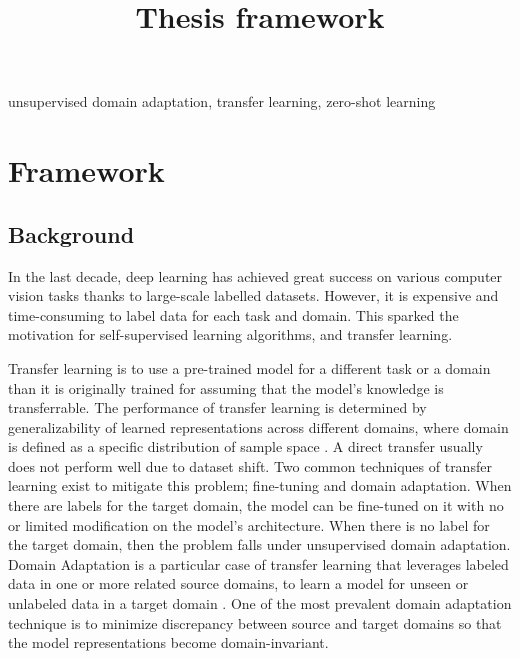 \documentclass[conference]{IEEEtran}
\begin{document}

\title{Thesis framework\\ }

\author{
}


\maketitle

\begin{abstract}
\end{abstract}

\begin{IEEEkeywords}
unsupervised domain adaptation, transfer learning, zero-shot learning
\end{IEEEkeywords}

\section{Framework}

\subsection{Background}

In the last decade, deep learning has achieved great success on various computer vision tasks thanks to large-scale labelled datasets. However, it is expensive and time-consuming to label data for each task and domain. This sparked the motivation for self-supervised learning algorithms, and transfer learning. 

Transfer learning is to use a pre-trained model for a different task or a domain than it is originally trained for assuming that the model's knowledge is transferrable. The performance of transfer learning is determined by generalizability of learned representations across different domains, where domain is defined as a specific distribution of sample space \cite{kouw2019review}. A direct transfer usually does not perform well due to dataset shift. Two common techniques of transfer learning exist to mitigate this problem; fine-tuning and domain adaptation. When there are labels for the target domain, the model can be fine-tuned on it with no or limited modification on the model's architecture. When there is no label for the target domain, then the problem falls under unsupervised domain adaptation. Domain Adaptation is a particular case of transfer learning that leverages labeled data in one or more related source domains, to learn a model for unseen or unlabeled data in a target domain \cite{Csurka2017}. One of the most prevalent domain adaptation technique is to minimize discrepancy between source and target domains so that the model representations become domain-invariant. 
\end{document}
